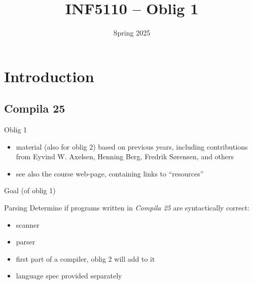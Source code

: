 \documentclass{beamer}
\date{Spring 2025}
\title{INF5110 -- Oblig 1}
\renewcommand{\maketitle}{}
\begin{document}
\maketitle

\setcounter{minitocdepth}{1}
\chapter{Introduction}
\label{sec:cc.intro}




\section{Compila 25}
\label{sec:org6733bd1}

\begin{frame}[label={sec:orga194049}]{Oblig 1}
\begin{itemize}
\item material (also for oblig 2) based on previous years, including contributions from Eyvind
W. Axelsen, Henning Berg, Fredrik Sørensen, and others
\end{itemize}


\begin{itemize}
\item see also the course web-page, containing links to ``resources''
\end{itemize}
\end{frame}
\begin{frame}[label={sec:org7a24c4b}]{Goal (of oblig 1)}
\begin{block}{Parsing}
Determine if programs written in \emph{Compila 25} are syntactically correct: 

\begin{itemize}
\item scanner
\item parser
\end{itemize}
\end{block}
\begin{itemize}
\item first part of a compiler, oblig 2 will add to it
\item language spec provided separately
\end{itemize}
\end{frame}
\end{document}
